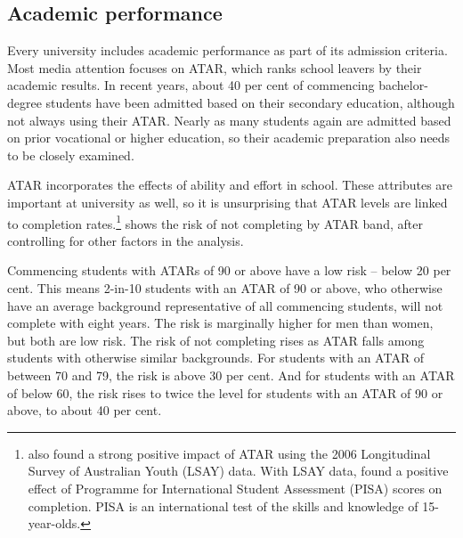 \subsection{Academic performance }\label{subsec:3.1.1}

Every university includes academic performance as part of its admission criteria. Most media attention focuses on ATAR, which ranks school leavers by their academic results. In recent years, about 40 per cent of commencing bachelor-degree students have been admitted based on their secondary education, although not always using their ATAR\@. Nearly as many students again are admitted based on prior vocational or higher education, so their academic preparation also needs to be closely examined.

ATAR incorporates the effects of ability and effort in school. These attributes are important at university as well, so it is unsurprising that ATAR levels are linked to completion rates.\footnote{\textcite{Cardak2017} also found a strong positive impact of ATAR using the 2006 Longitudinal Survey of Australian Youth (LSAY) data. With LSAY data, \textcite{Lim2011} found a positive effect of Programme for International Student Assessment (PISA) scores on completion. PISA is an international test of the skills and knowledge of 15-year-olds.}  shows the risk of not completing by ATAR band, after controlling for other factors in the analysis.

Commencing students with ATARs of 90 or above have a low risk -- below 20 per cent. This means 2-in-10 students with an ATAR of 90 or above, who otherwise have an average background representative of all commencing students, will not complete with eight years. The risk is marginally higher for men than women, but both are low risk. The risk of not completing rises as ATAR falls among students with otherwise similar backgrounds. For students with an ATAR of between 70 and 79, the risk is above 30 per cent. And for students with an ATAR of below 60, the risk rises to twice the level for students with an ATAR of 90 or above, to about 40 per cent.


